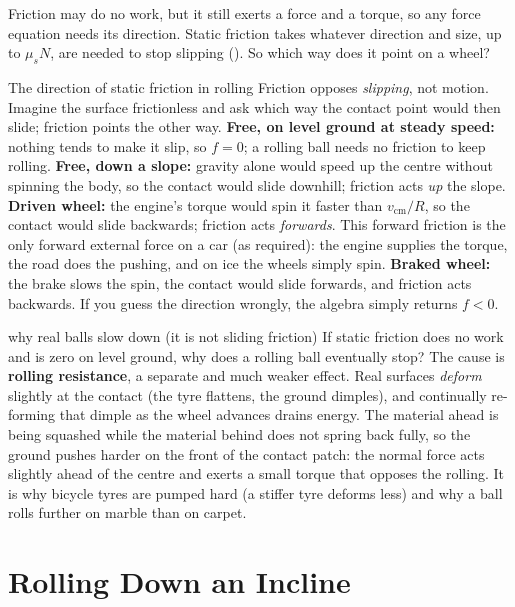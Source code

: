 Friction may do no work, but it still exerts a force and a torque, so any force equation needs its
direction. Static friction takes whatever direction and size, up to $\mu_sN$, are needed to stop slipping
(). So which way does it point on a wheel?

\begin{methodbox}{The direction of static friction in rolling}
Friction opposes \emph{slipping}, not motion. Imagine the surface frictionless and ask which way the contact
point would then slide; friction points the other way.
\textbf{Free, on level ground at steady speed:} nothing tends to make it slip, so $f=0$; a rolling ball
needs no friction to keep rolling.
\textbf{Free, down a slope:} gravity alone would speed up the centre without spinning the body, so the
contact would slide downhill; friction acts \emph{up} the slope.
\textbf{Driven wheel:} the engine's torque would spin it faster than $v_{\text{cm}}/R$, so the contact would
slide backwards; friction acts \emph{forwards}. This forward friction is the only forward external force
on a car (as  required): the engine supplies the torque, the road does the pushing, and on
ice the wheels simply spin.
\textbf{Braked wheel:} the brake slows the spin, the contact would slide forwards, and friction acts backwards.
If you guess the direction wrongly, the algebra simply returns $f<0$.
\end{methodbox}

\begin{trapbox}{why real balls slow down (it is not sliding friction)}
If static friction does no work and is zero on level ground, why does a rolling ball eventually stop? The
cause is \textbf{rolling resistance}, a separate and much weaker effect. Real surfaces
\emph{deform} slightly at the contact (the tyre flattens, the ground dimples), and continually
re-forming that dimple as the wheel advances drains energy. The material ahead is being squashed while the
material behind does not spring back fully, so the ground pushes harder on the front of the contact patch:
the normal force acts slightly ahead of the centre and exerts a small torque that opposes the rolling. It
is why bicycle tyres are pumped hard (a stiffer tyre deforms less) and why a ball rolls further on marble
than on carpet.
\end{trapbox}

\section{Rolling Down an Incline}

